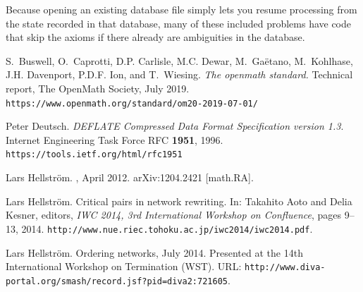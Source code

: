 \documentclass{article}
\theoremstyle{definition}
\providecommand{\url}[1]{\texttt{#1}}
\begin{document}
Because opening an existing database file simply lets you resume 
processing from the state recorded in that database, many of these 
included problems have code that skip the axioms if there already are 
ambiguities in the database.



\begin{thebibliography}{99}

  S.~Buswell, O.~Caprotti, D.P. Carlisle, M.C. Dewar, M.~Ga{\"e}tano,
    M.~Kohlhase, J.H. Davenport, P.D.F. Ion, and T.~Wiesing.
  \newblock \textit{The openmath standard.}
  \newblock Technical report, The OpenMath Society, July 2019.
  \newblock \url{https://www.openmath.org/standard/om20-2019-07-01/}



  Peter Deutsch.
  \textit{DEFLATE Compressed Data Format Specification version 1.3}.
  Internet Engineering Task Force RFC \textbf{1951}, 1996.
  \url{https://tools.ietf.org/html/rfc1951}

  Lars Hellstr{\"o}m.
  , April 2012.
  \newblock arXiv:1204.2421 [math.RA].


   Lars Hellstr{\"o}m.
   \newblock Critical pairs in network rewriting.
   \newblock In: Takahito Aoto and Delia Kesner, editors, {\em IWC 2014, 3rd
     International Workshop on Confluence}, pages 9--13, 2014.
   \newblock \url{http://www.nue.riec.tohoku.ac.jp/iwc2014/iwc2014.pdf}.
  

  Lars Hellstr{\"o}m.
  \newblock Ordering networks, July 2014.
  \newblock Presented at the 14th International Workshop on Termination (WST).
  \newblock URL:
    \url{http://www.diva-portal.org/smash/record.jsf?pid=diva2:721605}.


\end{thebibliography}
\end{document}
